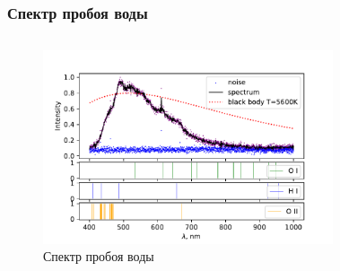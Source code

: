 \documentclass{beamer}
\begin{document}
	\begin{frame}
		\frametitle{Спектр пробоя воды}
		\begin{columns}
			\begin{figure}
				\centering
				\includegraphics[width=1.1\linewidth]{gen/water_lines.pdf}
				\caption*{Спектр пробоя воды}
			\end{figure}	
			\begin{figure}
				\centering

\end{figure}
\end{columns}
\end{frame}
\end{document}
